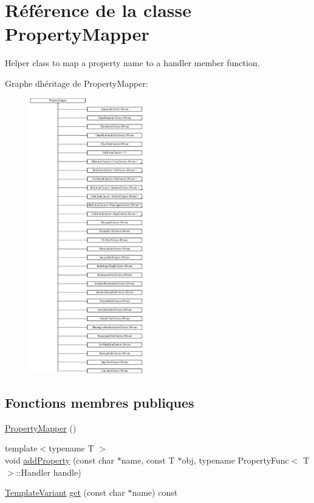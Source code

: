 \hypertarget{class_property_mapper}{}\section{Référence de la classe Property\+Mapper}
\label{class_property_mapper}


Helper class to map a property name to a handler member function.  


Graphe d\textquotesingle{}héritage de Property\+Mapper\+:\begin{figure}[H]
\begin{center}
\leavevmode
\includegraphics[height=12.000000cm]{class_property_mapper}
\end{center}
\end{figure}
\subsection*{Fonctions membres publiques}
\begin{DoxyCompactItemize}
\item 
\hyperlink{class_property_mapper_a4a8e8245d3d8c94a7c3609c2515812ec}{Property\+Mapper} ()
\item 
{\footnotesize template$<$typename T $>$ }\\void \hyperlink{class_property_mapper_ac427558104544b59dde63e66eba5174d}{add\+Property} (const char $\ast$name, const T $\ast$obj, typename Property\+Func$<$ T $>$\+::Handler handle)
\item 
\hyperlink{class_template_variant}{Template\+Variant} \hyperlink{class_property_mapper_ae2268afc92cea42272bb42d3137679c3}{get} (const char $\ast$name) const 
\end{DoxyCompactItemize}


